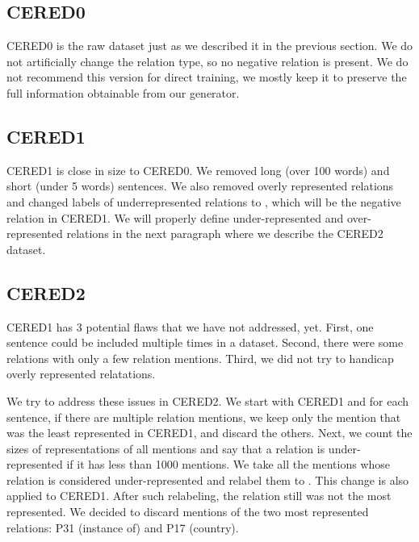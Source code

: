 \subsection{CERED0}
CERED0 is the raw dataset just as we described it in the previous section. We do not artificially change the relation type, so no negative relation is present. We do not recommend this version for direct training, we mostly keep it to preserve the full information obtainable from our generator.

\subsection{CERED1}
CERED1 is close in size to CERED0. We removed long (over 100 words) and short (under 5 words) sentences. We also removed overly represented relations and changed labels of underrepresented relations to , which will be the negative relation in CERED1. We will properly define under-represented and over-represented relations in the next paragraph where we describe the CERED2 dataset.

\subsection{CERED2}

CERED1 has 3 potential flaws that we have not addressed, yet. First, one sentence could be included multiple times in a dataset. Second, there were some relations with only a few relation mentions. Third, we did not try to handicap overly represented relatations. 

We try to address these issues in CERED2. We start with CERED1 and for each sentence, if there are multiple relation mentions, we keep only the mention that was the least represented in CERED1, and discard the others. Next, we count the sizes of representations of all mentions and say that a relation is under-represented if it has less than 1000 mentions. We take all the mentions whose relation is considered under-represented and relabel them to . This change is also applied to CERED1. After such relabeling, the  relation still was not the most represented. We decided to discard mentions of the two most represented relations: P31 (instance of) and P17 (country).

